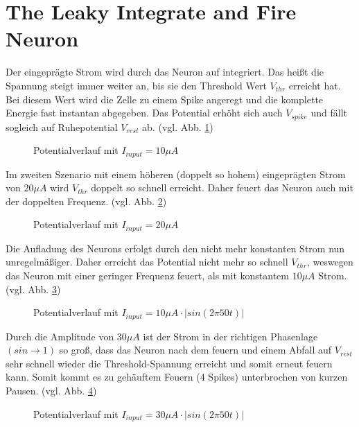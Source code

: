 \documentclass[conference]{IEEEtran}
\begin{document}
\section{The Leaky Integrate and Fire Neuron}
Der eingeprägte Strom wird durch das Neuron auf integriert. Das heißt die Spannung steigt immer weiter an, bis sie den Threshold Wert $V_{thr}$ erreicht hat. Bei diesem Wert wird die Zelle zu einem Spike angeregt und die komplette Energie fast instantan abgegeben. Das Potential erhöht sich auch $V_{spike}$ und fällt sogleich auf Ruhepotential $V_{rest}$ ab. (vgl. Abb. \ref{fig:neuron1})\\
\begin{figure}[h!]
  	\centering
    \scalebox{.5}{}
    \caption{Potentialverlauf mit $I_{input} = 10\mu A$}
    \label{fig:neuron1}
\end{figure}
Im zweiten Szenario mit einem höheren (doppelt so hohem) eingeprägten Strom von $20\mu A$ wird $V_{thr}$ doppelt so schnell erreicht. Daher feuert das Neuron auch mit der doppelten Frequenz. (vgl. Abb. \ref{fig:neuron2})\\
\begin{figure}[h!]
  	\centering
    \scalebox{.5}{}
    \caption{Potentialverlauf mit $I_{input} = 20\mu A$}
    \label{fig:neuron2}
\end{figure}
Die Aufladung des Neurons erfolgt durch den nicht mehr konstanten Strom nun unregelmäßiger. Daher erreicht das Potential nicht mehr so schnell $V_{thr}$, weswegen das Neuron mit einer geringer Frequenz feuert, als mit konstantem $10\mu A$ Strom. (vgl. Abb. \ref{fig:neuron3})\\
\begin{figure}[h!]
  	\centering
    \scalebox{.5}{}
    \caption{Potentialverlauf mit $I_{input} = 10\mu A \cdot |sin(2\pi 50 t)|$}
    \label{fig:neuron3}
\end{figure}
Durch die Amplitude von $30\mu A$ ist der Strom in der richtigen Phasenlage $(sin \rightarrow 1)$ so groß, dass das Neuron nach dem feuern und einem Abfall auf $V_{rest}$ sehr schnell wieder die Threshold-Spannung erreicht und somit erneut feuern kann. Somit kommt es zu gehäuftem Feuern (4 Spikes) unterbrochen von kurzen Pausen. (vgl. Abb. \ref{fig:neuron4})
\begin{figure}[h!]
  	\centering
    \scalebox{.5}{}
    \caption{Potentialverlauf mit $I_{input} = 30\mu A \cdot |sin(2\pi 50 t)|$}
    \label{fig:neuron4}
\end{figure}
\end{document}
